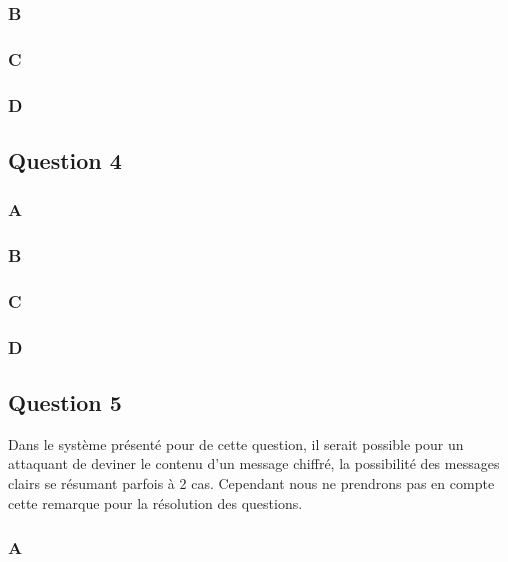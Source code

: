 \documentclass[a4paper, 11pt, oneside]{article}
\begin{document}
\subsubsection{B}

\subsubsection{C}

\subsubsection{D}

\subsection{Question 4}

\subsubsection{A}

\subsubsection{B}

\subsubsection{C}

\subsubsection{D}

\subsection{Question 5}

Dans le système présenté pour de cette question, il serait possible pour un attaquant de deviner le contenu d'un message chiffré, la possibilité des messages clairs se résumant parfois à 2 cas. Cependant nous ne prendrons pas en compte cette remarque pour la résolution des questions.

\subsubsection{A}
\end{document}

